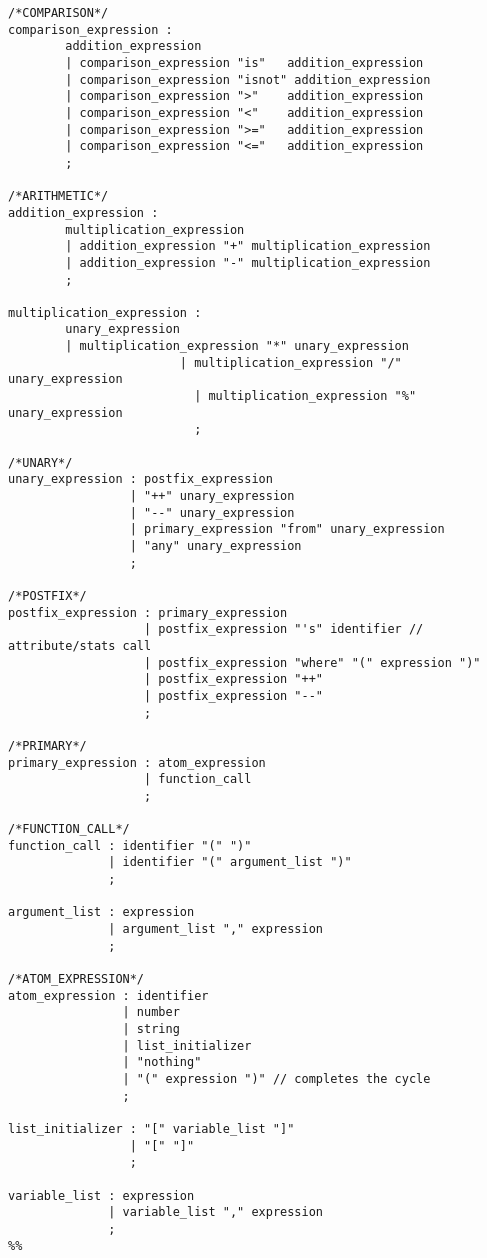 \begin{singlespacing}
\begin{verbatim}
/*COMPARISON*/
comparison_expression : 
        addition_expression
        | comparison_expression "is"   addition_expression
        | comparison_expression "isnot" addition_expression
        | comparison_expression ">"    addition_expression
        | comparison_expression "<"    addition_expression
        | comparison_expression ">="   addition_expression
        | comparison_expression "<="   addition_expression
        ;

/*ARITHMETIC*/
addition_expression : 
        multiplication_expression
        | addition_expression "+" multiplication_expression
        | addition_expression "-" multiplication_expression
        ;

multiplication_expression : 
        unary_expression
        | multiplication_expression "*" unary_expression
                        | multiplication_expression "/" unary_expression
                          | multiplication_expression "%" unary_expression
                          ;

/*UNARY*/
unary_expression : postfix_expression
                 | "++" unary_expression
                 | "--" unary_expression
                 | primary_expression "from" unary_expression
                 | "any" unary_expression
                 ;

/*POSTFIX*/
postfix_expression : primary_expression
                   | postfix_expression "'s" identifier // attribute/stats call
                   | postfix_expression "where" "(" expression ")"
                   | postfix_expression "++"
                   | postfix_expression "--"
                   ;

/*PRIMARY*/
primary_expression : atom_expression
                   | function_call
                   ;

/*FUNCTION_CALL*/
function_call : identifier "(" ")"
              | identifier "(" argument_list ")"
              ;

argument_list : expression
              | argument_list "," expression
              ;

/*ATOM_EXPRESSION*/
atom_expression : identifier
                | number
                | string
                | list_initializer
                | "nothing"
                | "(" expression ")" // completes the cycle
                ;

list_initializer : "[" variable_list "]"
                 | "[" "]"
                 ;

variable_list : expression
              | variable_list "," expression
              ;
%%
\end{verbatim}
\end{singlespacing}
